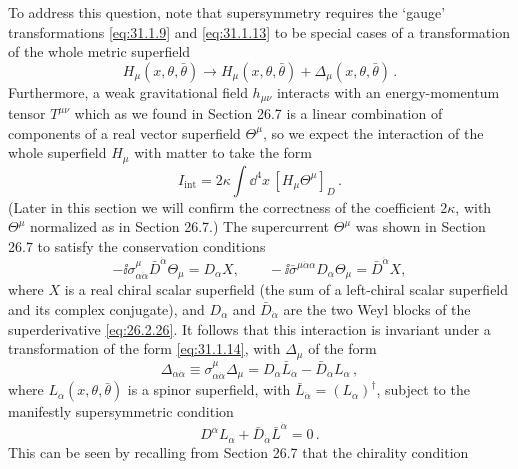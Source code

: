To address this question, note that supersymmetry requires the `gauge'
transformations \eqref{eq:31.1.9} and \eqref{eq:31.1.13} to be special cases
of a transformation of the whole metric superfield
\begin{equation}
  H_\mu(x,\theta,\bar\theta)\to
  H_\mu(x,\theta,\bar\theta)+\Delta_\mu(x,\theta,\bar\theta)\,.
  \tag{31.1.14}\label{eq:31.1.14}
\end{equation}
Furthermore, a weak gravitational field \(h_{\mu\nu}\) interacts with an
energy-momentum tensor \(T^{\mu\nu}\) which as we found in Section 26.7 is a
linear combination of components of a real vector superfield \(\Theta^\mu\),
so we expect the interaction of the whole superfield \(H_\mu\) with matter to
take the form
\begin{equation}
  I_{\mathrm{int}}
  =2\kappa\int \dd^4x\,[H_\mu\Theta^\mu]_D\,.
  \tag{31.1.15}\label{eq:31.1.15}
\end{equation}
(Later in this section we will confirm the correctness of the coefficient
\(2\kappa\), with \(\Theta^\mu\) normalized as in Section 26.7.) The
supercurrent \(\Theta^\mu\) was shown in Section 26.7 to satisfy the
conservation conditions
\begin{equation}
  -\ii\sigma^\mu_{\alpha\dot\alpha}
     \bar D^{\dot\alpha}\Theta_\mu=D_\alpha X,
  \qquad
  -\ii\bar\sigma^{\mu\dot\alpha\alpha}
     D_\alpha\Theta_\mu=\bar D^{\dot\alpha}X,
  \tag{31.1.16}\label{eq:31.1.16}
\end{equation}
where \(X\) is a real chiral scalar superfield (the sum of a left-chiral
scalar superfield and its complex conjugate), and \(D_\alpha\) and
\(\bar D_{\dot\alpha}\) are the two Weyl blocks of the superderivative
\eqref{eq:26.2.26}. It follows that this
interaction is invariant under a transformation of the form
\eqref{eq:31.1.14}, with \(\Delta_\mu\) of the form
\begin{equation}
  \Delta_{\alpha\dot\alpha}
  \equiv\sigma^\mu_{\alpha\dot\alpha}\Delta_\mu
  =D_\alpha\bar L_{\dot\alpha}
   -\bar D_{\dot\alpha}L_\alpha\,,
  \tag{31.1.17}\label{eq:31.1.17}
\end{equation}
where \(L_\alpha(x,\theta,\bar\theta)\) is a spinor superfield, with
\(\bar L_{\dot\alpha}=(L_\alpha)^\dagger\), subject to the manifestly
supersymmetric condition
\begin{equation}
  D^\alpha L_\alpha
  +\bar D_{\dot\alpha}\bar L^{\dot\alpha}=0\,.
  \tag{31.1.18}\label{eq:31.1.18}
\end{equation}
This can be seen by recalling from Section 26.7 that the chirality condition
